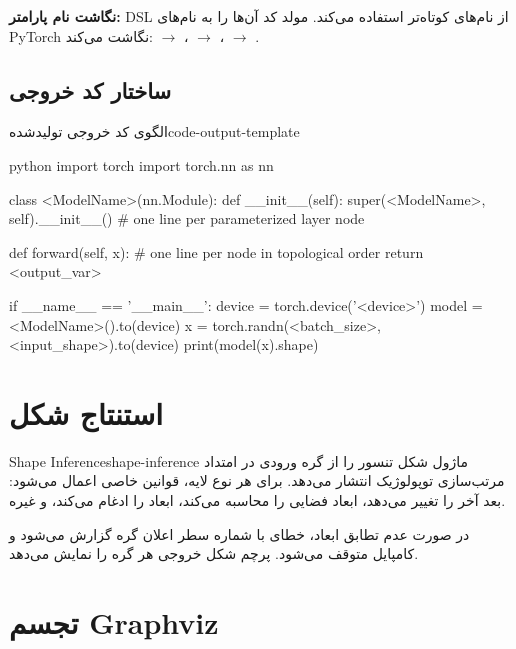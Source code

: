 \documentclass{nngraph-fa}
\begin{document}
\begin{notebox}
\textbf{نگاشت نام پارامتر:} DSL از نام‌های کوتاه‌تر استفاده می‌کند.
مولد کد آن‌ها را به نام‌های PyTorch نگاشت می‌کند:
 $\to$ ،
 $\to$ ،
 $\to$ .
\end{notebox}

\subsection{ساختار کد خروجی}

\begin{codebox}{الگوی کد خروجی تولیدشده}{code-output-template}
\begin{amzcode}{python}
import torch
import torch.nn as nn


class <ModelName>(nn.Module):
    def __init__(self):
        super(<ModelName>, self).__init__()
        # one line per parameterized layer node

    def forward(self, x):
        # one line per node in topological order
        return <output_var>


if __name__ == '__main__':
    device = torch.device('<device>')
    model  = <ModelName>().to(device)
    x      = torch.randn(<batch_size>, <input_shape>).to(device)
    print(model(x).shape)
\end{amzcode}
\end{codebox}

\section{استنتاج شکل}

\begin{dfnbox}{Shape Inference}{shape-inference}
ماژول  شکل تنسور را از گره ورودی در
امتداد مرتب‌سازی توپولوژیک انتشار می‌دهد. برای هر نوع لایه، قوانین
خاصی اعمال می‌شود:  بعد آخر را تغییر می‌دهد،
 ابعاد فضایی را محاسبه می‌کند،  ابعاد را
ادغام می‌کند، و غیره.
\end{dfnbox}

در صورت عدم تطابق ابعاد، خطای  با شماره سطر اعلان
گره گزارش می‌شود و کامپایل متوقف می‌شود. پرچم 
شکل خروجی هر گره را نمایش می‌دهد.

\section{تجسم Graphviz}
\end{document}
